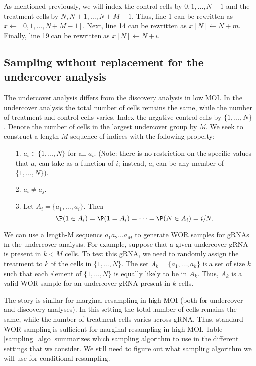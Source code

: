 \documentclass[12pt]{article}
\begin{document}
As mentioned previously, we will index the control cells by $0, 1, \dots, N - 1$ and the treatment cells by $N, N+1, \dots, N + M - 1$. Thus, line 1 can be rewritten as $x \leftarrow [0, 1, \dots, N + M - 1].$ Next, line 14 can be rewritten as $x[N] \leftarrow N + m$. Finally, line 19 can be rewritten as $x[N] \leftarrow N + i$.

\subsection*{Sampling without replacement for the undercover analysis}

The undercover analysis differs from the discovery analysis in low MOI. In the undercover analysis the total number of cells remains the same, while the number of treatment and control cells varies. Index the negative control cells by $\{1, \dots, N\}$. Denote the number of cells in the largest undercover group by $M$. We seek to construct a length-$M$ sequence of indices with the following property:

\begin{itemize}
\item[1.] $a_i \in \{1, \dots, N\}$ for all $a_i$. (Note: there is no restriction on the specific values that $a_i$ can take as a function of $i$; instead, $a_i$ can be any member of $ \{1, \dots, N \}$).
\item[2.] $a_i \neq a_j$.
\item[3.] Let $A_i = \{ a_1, \dots, a_i \}.$ Then
$$ \P( 1 \in A_i ) = \P(1 = A_i) = \dots = \P(N \in A_i ) = i/N.$$
\end{itemize}

We can use a length-M sequence $a_1 a_2 \dots a_M$ to generate WOR samples for gRNAs in the undercover analysis. For example, suppose that a given undercover gRNA is present in $k < M$ cells. To test this gRNA, we need to randomly assign the treatment to $k$ of the cells in $\{ 1, \dots, N \}$. The set $A_k = \{a_1, \dots, a_k\}$ is a set of size $k$ such that each element of $\{1, \dots, N\}$ is equally likely to be in $A_k$. Thus, $A_k$ is a valid WOR sample for an undercover gRNA present in $k$ cells.

The story is similar for marginal resampling in high MOI (both for undercover and discovery analyses). In this setting the total number of cells remains the same, while the number of treatment cells varies across gRNA. Thus, standard WOR sampling is sufficient for marginal resampling in high MOI. Table \ref{sampling_algo} summarizes which sampling algorithm to use in the different settings that we consider. We still need to figure out what sampling algorithm we will use for conditional resampling.
\end{document}
